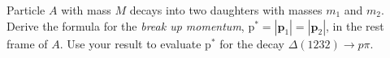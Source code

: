 
\newcommand{\ma}{\ensuremath{M}\xspace}
\newcommand{\mb}{\ensuremath{m_1}\xspace}
\newcommand{\mc}{\ensuremath{m_2}\xspace}
\newcommand{\eb}{\ensuremath{E_1}\xspace}
\newcommand{\ec}{\ensuremath{E_2}\xspace}

\newcommand{\pb}{\ensuremath{p_1}\xspace}
\newcommand{\pc}{\ensuremath{p_2}\xspace}
\newcommand{\pvecb}{\ensuremath{\textbf{p}_1}\xspace}
\newcommand{\pvecc}{\ensuremath{\textbf{p}_2}\xspace}
\newcommand{\pvecstar}{\ensuremath{\textbf{p}^{*}}\xspace}
\newcommand{\pmodvecb}{\ensuremath{\text{p}_1}\xspace}
\newcommand{\pmodvecc}{\ensuremath{\text{p}_2}\xspace}
\newcommand{\pmodvecstar}{\ensuremath{\text{p}^{*}}\xspace}

\be

\item Particle $A$ with mass \ma decays into two daughters with masses \mb
and \mc.  Derive the formula for the {\em break up momentum},
$\pmodvecstar = |\pvecb| = |\pvecc|$, in the rest frame of $A$.
Use your result to evaluate $\pmodvecstar$ for the decay \mbox{$\Delta(1232)\to p\pi$}.

